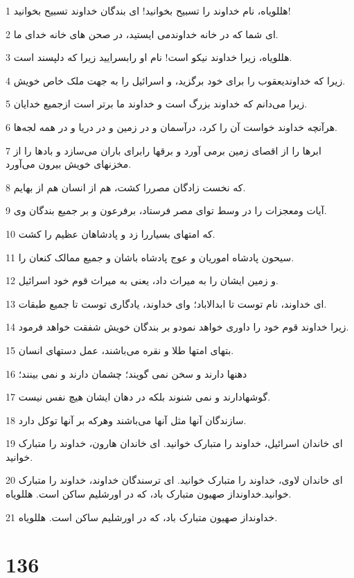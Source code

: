 \par 1 هللویاه، نام خداوند را تسبیح بخوانید! ای بندگان خداوند تسبیح بخوانید!
\par 2 ‌ای شما که در خانه خداوندمی ایستید، در صحن های خانه خدای ما.
\par 3 هللویاه، زیرا خداوند نیکو است! نام او رابسرایید زیرا که دلپسند است.
\par 4 زیرا که خداوندیعقوب را برای خود برگزید، و اسرائیل را به جهت ملک خاص خویش.
\par 5 زیرا می‌دانم که خداوند بزرگ است و خداوند ما برتر است ازجمیع خدایان.
\par 6 هر‌آنچه خداوند خواست آن را کرد، درآسمان و در زمین و در دریا و در همه لجه‌ها.
\par 7 ابرها را از اقصای زمین برمی آورد و برقها رابرای باران می‌سازد و بادها را از مخزنهای خویش بیرون می‌آورد.
\par 8 که نخست زادگان مصررا کشت، هم از انسان هم از بهایم.
\par 9 آیات ومعجزات را در وسط تو‌ای مصر فرستاد، برفرعون و بر جمیع بندگان وی.
\par 10 که امتهای بسیاررا زد و پادشاهان عظیم را کشت.
\par 11 سیحون پادشاه اموریان و عوج پادشاه باشان و جمیع ممالک کنعان را.
\par 12 و زمین ایشان را به میراث داد، یعنی به میراث قوم خود اسرائیل.
\par 13 ‌ای خداوند، نام توست تا ابدالاباد؛ و‌ای خداوند، یادگاری توست تا جمیع طبقات.
\par 14 زیرا خداوند قوم خود را داوری خواهد نمودو بر بندگان خویش شفقت خواهد فرمود.
\par 15 بتهای امتها طلا و نقره می‌باشند، عمل دستهای انسان.
\par 16 دهنها دارند و سخن نمی گویند؛ چشمان دارند و نمی بینند؛
\par 17 گوشهادارند و نمی شنوند بلکه در دهان ایشان هیچ نفس نیست.
\par 18 سازندگان آنها مثل آنها می‌باشند وهرکه بر آنها توکل دارد.
\par 19 ‌ای خاندان اسرائیل، خداوند را متبارک خوانید. ای خاندان هارون، خداوند را متبارک خوانید.
\par 20 ‌ای خاندان لاوی، خداوند را متبارک خوانید. ای ترسندگان خداوند، خداوند را متبارک خوانید.خداونداز صهیون متبارک باد، که در اورشلیم ساکن است. هللویاه. 
\par 21 خداونداز صهیون متبارک باد، که در اورشلیم ساکن است. هللویاه.
 
\chapter{136}

